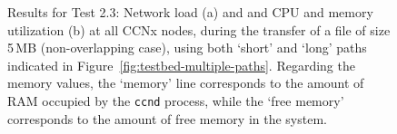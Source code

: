 \begin{figure}[H]
    \centering



    \cprotect\caption{Results for Test 2.3: Network load (a) and and 
        CPU and memory utilization (b) at 
        all CCNx nodes, during the transfer of a file of size 5\,MB 
        (non-overlapping case), using both `short' and `long' paths indicated in 
        Figure~\ref{fig:testbed-multiple-paths}. Regarding the 
        memory values, the `memory' line corresponds to the amount of RAM 
        occupied by the \verb+ccnd+ process, while the `free memory' corresponds 
        to the amount of free memory in the system.}
    \label{fig:long-short-route-app}

\end{figure}


